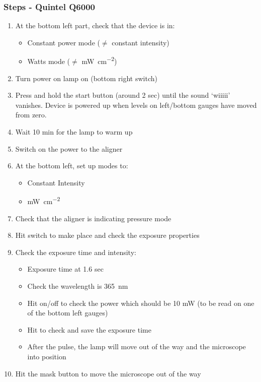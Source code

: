 \subsubsection{Steps - Quintel Q6000}
\begin{enumerate}
\item At the bottom left part, check that the device is in:
\begin{itemize}[nolistsep, noitemsep]
\item Constant power mode ($\neq$ constant intensity)
\item Watts mode ($\neq$ \si{\milli\watt\per\square\centi\meter})
\end{itemize}
\item Turn power on lamp on (bottom right switch)
\item Press and hold the start button (around 2 sec) until the sound `wiiiii' vanishes.
Device is powered up when levels on left/bottom gauges have moved from zero.
\item Wait 10 min for the lamp to warm up
\item Switch on the power to the aligner
\item At the bottom left, set up modes to:
\begin{itemize}[nolistsep, noitemsep]
  \item Constant Intensity
  \item \si{\milli\watt\per\square\centi\meter}
\end{itemize}
\item Check that the aligner is indicating pressure mode
\item Hit  switch to make place and check the exposure properties
\item Check the exposure time and intensity:
\begin{itemize}[nolistsep, noitemsep]
  \item Exposure time at 1.6 sec
  \item Check the wavelength is \SI{365}{\nano\meter}
  \item Hit  on/off to check the power which should be 10 mW (to be read on one of the bottom left gauges)
  \item Hit  to check and save the exposure time
  \item After the pulse, the lamp will move out of the way and the microscope into position
\end{itemize}
\item Hit the mask  button to move the microscope out of the way

\end{enumerate}
